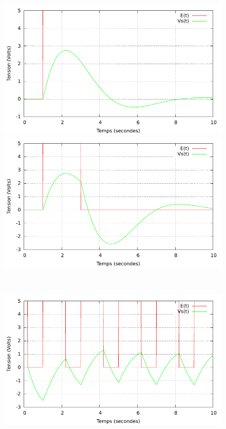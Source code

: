 \documentclass[a4paper,11pt]{article}
\begin{document}
\begin{figure}[h!]
   \begin{minipage}[b]{0.5\linewidth}
      \centering \includegraphics[scale=0.68]{CDechelon.pdf}
   \end{minipage}\hfill
   \begin{minipage}[b]{0.5\linewidth}   
      \centering \includegraphics[scale=.68]{CDporte.pdf}
   \end{minipage}\\
    \begin{minipage}[b]{0.5\linewidth}   
      \centering \includegraphics[scale=.68]{CDcarre.pdf}

\end{minipage}
\end{figure}
\end{document}
